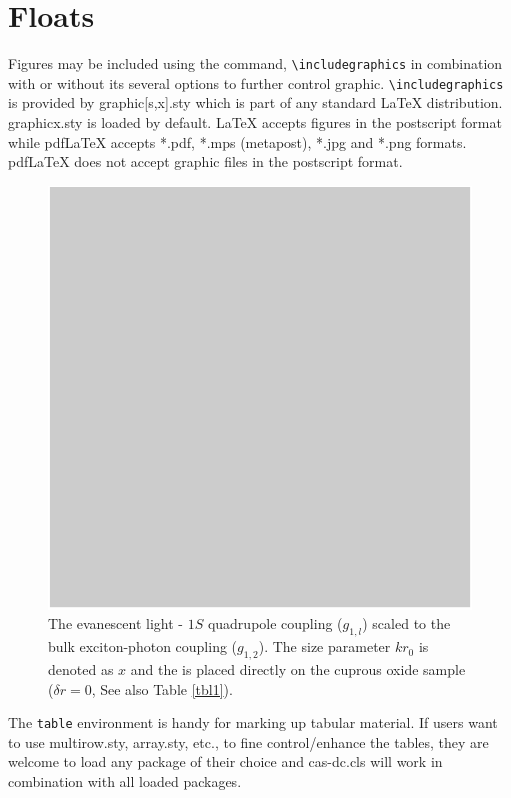 \documentclass[a4paper,fleqn]{cas-dc}
\begin{document}
\section{Floats}
{Figures} may be included using the command,\linebreak 
\verb+\includegraphics+ in
combination with or without its several options to further control
graphic. \verb+\includegraphics+ is provided by {graphic[s,x].sty}
which is part of any standard \LaTeX{} distribution.
{graphicx.sty} is loaded by default. \LaTeX{} accepts figures in
the postscript format while pdf\LaTeX{} accepts {*.pdf},
{*.mps} (metapost), {*.jpg} and {*.png} formats. 
pdf\LaTeX{} does not accept graphic files in the postscript format. 
\begin{figure}
	\centering
		\includegraphics[scale=.75]{figs/Fig1.pdf}
	\caption{The evanescent light - $1S$ quadrupole coupling
	($g_{1,l}$) scaled to the bulk exciton-photon coupling
	($g_{1,2}$). The size parameter $kr_{0}$ is denoted as $x$ and
	the \PMS is placed directly on the cuprous oxide sample ($\delta
	r=0$, See also Table \protect\ref{tbl1}).}
	\label{FIG:1}
\end{figure}


The \verb+table+ environment is handy for marking up tabular
material. If users want to use {multirow.sty},
{array.sty}, etc., to fine control/enhance the tables, they
are welcome to load any package of their choice and
{cas-dc.cls} will work in combination with all loaded
packages.
\end{document}
